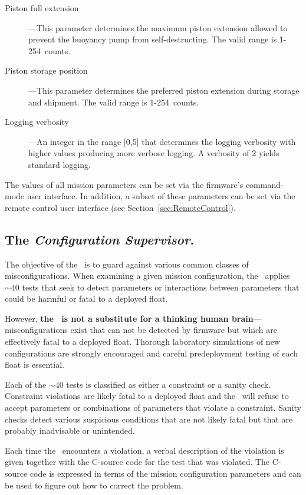 \begin{description}
\item[Piston full extension]---This parameter determines the maximum piston
  extension allowed to prevent the buoyancy pump from self-destructing.  The
  valid range is 1-254~counts.

\item[Piston storage position]---This parameter determines the preferred
  piston extension during storage and shipment.  The valid range is
  1-254~counts.

\item[Logging verbosity]---An integer in the range [0,5] that determines the
  logging verbosity with higher values producing more verbose logging.  A
  verbosity of 2 yields standard logging.

\end{description}

The values of all mission parameters can be set via the firmware's
command-mode user interface.  In addition, a subset of these parameters can
be set via the remote control user interface (see
Section~\ref{sec:RemoteControl}).  

\subsection{The \emph{Configuration Supervisor}.}
\label{sec:ConfigSupervisor}

The objective of the \cs\ is to guard against various common classes of
misconfigurations.  When examining a given mission configuration, the \cs\
applies $\sim40$ tests that seek to detect parameters or interactions
between parameters that could be harmful or fatal to a deployed float.

However, \textbf{the \cs\ is not a substitute for a thinking human
  brain}---misconfigurations exist that can not be detected by firmware but
which are effectively fatal to a deployed float.  Thorough laboratory
simulations of new configurations are strongly encouraged and careful
predeployment testing of each float is essential.

Each of the $\sim40$ tests is classified as either a constraint or a sanity
check.  Constraint violations are likely fatal to a deployed float and the
\cs\ will refuse to accept parameters or combinations of parameters that
violate a constraint.  Sanity checks detect various suspicious conditions
that are not likely fatal but that are probably inadvisable or unintended.

Each time the \cs\ encounters a violation, a verbal description of the
violation is given together with the C-source code for the test that was
violated.  The C-source code is expressed in terms of the mission
configuration parameters and can be used to figure out how to correct the
problem. 


